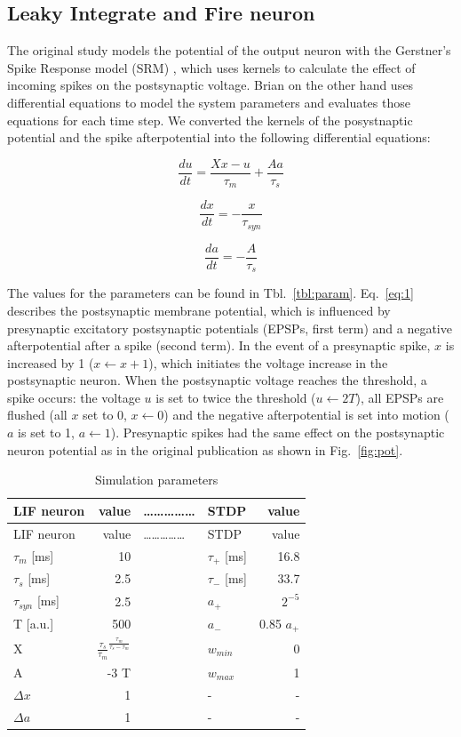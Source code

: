 \documentclass[10pt,a4paper,onecolumn]{article}
\begin{document}
\subsection{Leaky Integrate and Fire
neuron}\label{leaky-integrate-and-fire-neuron}

The original study models the potential of the output neuron with the
Gerstner's Spike Response model (SRM) \autocite{Gerstner2002}, which
uses kernels to calculate the effect of incoming spikes on the
postsynaptic voltage. Brian on the other hand uses differential
equations to model the system parameters and evaluates those equations
for each time step. We converted the kernels of the posystnaptic
potential and the spike afterpotential into the following differential
equations:

\begin{equation}\frac{du}{dt} = \frac{Xx - u}{\tau_{m}} + \frac{Aa}{\tau_{s}} \label{eq:u} \label{eq:1}\end{equation}

\begin{equation}\frac{dx}{dt} = -\frac{x}{\tau_{syn}}\label{eq:2}\end{equation}

\begin{equation}\frac{da}{dt} = -\frac{A}{\tau_{s}}\label{eq:3}\end{equation}

The values for the parameters can be found in Tbl.~\ref{tbl:param}.
Eq.~\ref{eq:1} describes the postsynaptic membrane potential, which is
influenced by presynaptic excitatory postsynaptic potentials (EPSPs,
first term) and a negative afterpotential after a spike (second term).
In the event of a presynaptic spike, \(x\) is increased by 1
(\(x\leftarrow x+1\)), which initiates the voltage increase in the
postsynaptic neuron. When the postsynaptic voltage reaches the
threshold, a spike occurs: the voltage \(u\) is set to twice the
threshold (\(u\leftarrow 2T\)), all EPSPs are flushed (all \(x\) set to
0, \(x\leftarrow 0\)) and the negative afterpotential is set into motion
(\(a\) is set to 1, \(a\leftarrow 1\)). Presynaptic spikes had the same
effect on the postsynaptic neuron potential as in the original
publication as shown in Fig.~\ref{fig:pot}.

\hypertarget{tbl:simt}{}
\begin{longtable}[]{@{}lrllr@{}}
\caption{\label{tbl:simt}Simulation parameters }\tabularnewline
\toprule
LIF neuron & value & \ldots{}\ldots{}\ldots{}\ldots{}\ldots{} & STDP &
value\tabularnewline
\midrule
\endfirsthead
\toprule
LIF neuron & value & \ldots{}\ldots{}\ldots{}\ldots{}\ldots{} & STDP &
value\tabularnewline
\midrule
\endhead
\(\tau_{m}\) {[}ms{]} & 10 & & \(\tau_{+}\) {[}ms{]} &
16.8\tabularnewline
\(\tau_{s}\) {[}ms{]} & 2.5 & & \(\tau_{-}\) {[}ms{]} &
33.7\tabularnewline
\(\tau_{syn}\) {[}ms{]} & 2.5 & & \(a_{+}\) & \(2^{-5}\)\tabularnewline
T {[}a.u.{]} & 500 & & \(a_{-}\) & 0.85 \(a_{+}\)\tabularnewline
X & \(\frac{\tau_{s}}{\tau_{m}}^{\frac{\tau_{m}}{\tau_{s} -\tau_{m}}}\)
& & \(w_{min}\) & 0\tabularnewline
A & -3 T & & \(w_{max}\) & 1\tabularnewline
\(\Delta x\) & 1 & & - & -\tabularnewline
\(\Delta a\) & 1 & & - & -\tabularnewline
\bottomrule
\end{longtable}
\end{document}
